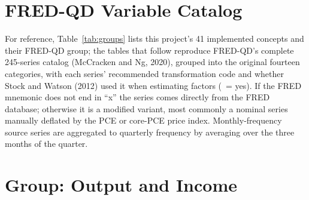 \documentclass[11pt]{article}
\begin{document}
\appendix

\begin{landscape}
\section{FRED-QD Variable Catalog}
\label{app:catalog}

For reference, Table~\ref{tab:groups} lists this project's 41 implemented
concepts and their FRED-QD group; the tables that follow reproduce
FRED-QD's complete 245-series catalog (McCracken and Ng, 2020), grouped
into the original fourteen categories, with each series' recommended
transformation code and whether Stock and Watson (2012) used it when
estimating factors (\checkmark~= yes). If the FRED mnemonic does not end
in ``x'' the series comes directly from the FRED database; otherwise it is
a modified variant, most commonly a nominal series manually deflated by
the PCE or core-PCE price index. Monthly-frequency source series are
aggregated to quarterly frequency by averaging over the three months of
the quarter.

\section*{Group: Output and Income}


\end{landscape}
\end{document}
